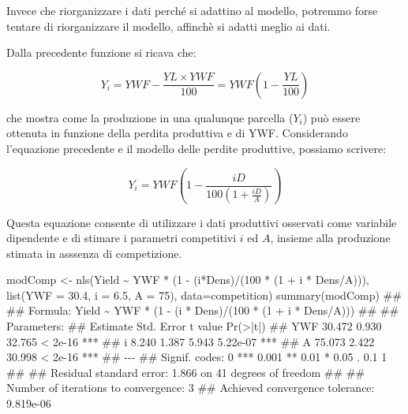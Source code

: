 \documentclass[a4paper,12pt,oneside]{book}
\newenvironment{Shaded}{\begin{snugshade}}{\end{snugshade}}
\newcommand{\DecValTok}[1]{#1}
\newcommand{\FloatTok}[1]{#1}
\newcommand{\SpecialCharTok}[1]{#1}
\newcommand{\DocumentationTok}[1]{#1}
\newcommand{\OtherTok}[1]{#1}
\newcommand{\FunctionTok}[1]{#1}
\newcommand{\AttributeTok}[1]{#1}
\newcommand{\NormalTok}[1]{#1}
\begin{document}
Invece che riorganizzare i dati perché si adattino al modello, potremmo forse tentare di riorganizzare il modello, affinchè si adatti meglio ai dati.

Dalla precedente funzione si ricava che:

\[Y_i = YWF - \frac{YL \times YWF}{100} = YWF\left( {1 - \frac{YL}{100}} \right)\]

che mostra come la produzione in una qualunque parcella (\(Y_i\)) può essere ottenuta in funzione della perdita produttiva e di YWF. Considerando l'equazione precedente e il modello delle perdite produttive, possiamo scrivere:

\[Y_i = YWF\left( {1 - \frac{iD}{100\left( {1 + \frac{iD}{A}} \right)}} \right)\]

Questa equazione consente di utilizzare i dati produttivi osservati come variabile dipendente e di stimare i parametri competitivi \(i\) ed \(A\), insieme alla produzione stimata in asssenza di competizione.

\begin{Shaded}
\begin{Highlighting}[]
\NormalTok{modComp }\OtherTok{\textless{}{-}} \FunctionTok{nls}\NormalTok{(Yield }\SpecialCharTok{\textasciitilde{}}\NormalTok{ YWF }\SpecialCharTok{*}\NormalTok{ (}\DecValTok{1} \SpecialCharTok{{-}}\NormalTok{ (i}\SpecialCharTok{*}\NormalTok{Dens)}\SpecialCharTok{/}\NormalTok{(}\DecValTok{100} \SpecialCharTok{*}\NormalTok{ (}\DecValTok{1} \SpecialCharTok{+}\NormalTok{ i }\SpecialCharTok{*}\NormalTok{ Dens}\SpecialCharTok{/}\NormalTok{A))),}
               \FunctionTok{list}\NormalTok{(}\AttributeTok{YWF =} \FloatTok{30.4}\NormalTok{, }\AttributeTok{i =} \FloatTok{6.5}\NormalTok{, }\AttributeTok{A =} \DecValTok{75}\NormalTok{),}
               \AttributeTok{data=}\NormalTok{competition)}
\FunctionTok{summary}\NormalTok{(modComp)}
\DocumentationTok{\#\# }
\DocumentationTok{\#\# Formula: Yield \textasciitilde{} YWF * (1 {-} (i * Dens)/(100 * (1 + i * Dens/A)))}
\DocumentationTok{\#\# }
\DocumentationTok{\#\# Parameters:}
\DocumentationTok{\#\#     Estimate Std. Error t value Pr(\textgreater{}|t|)    }
\DocumentationTok{\#\# YWF   30.472      0.930  32.765  \textless{} 2e{-}16 ***}
\DocumentationTok{\#\# i      8.240      1.387   5.943 5.22e{-}07 ***}
\DocumentationTok{\#\# A     75.073      2.422  30.998  \textless{} 2e{-}16 ***}
\DocumentationTok{\#\# {-}{-}{-}}
\DocumentationTok{\#\# Signif. codes:  0 \textquotesingle{}***\textquotesingle{} 0.001 \textquotesingle{}**\textquotesingle{} 0.01 \textquotesingle{}*\textquotesingle{} 0.05 \textquotesingle{}.\textquotesingle{} 0.1 \textquotesingle{} \textquotesingle{} 1}
\DocumentationTok{\#\# }
\DocumentationTok{\#\# Residual standard error: 1.866 on 41 degrees of freedom}
\DocumentationTok{\#\# }
\DocumentationTok{\#\# Number of iterations to convergence: 3 }
\DocumentationTok{\#\# Achieved convergence tolerance: 9.819e{-}06}
\end{Highlighting}
\end{Shaded}
\end{document}
